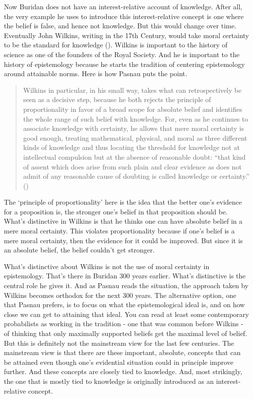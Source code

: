 \documentclass[
  12pt,
  letterpaper,
]{scrbook}
\begin{document}
Now Buridan does not have an interest-relative account of knowledge.
After all, the very example he uses to introduce this interest-relative
concept is one where the belief is false, and hence not knowledge. But
this would change over time. Eventually John Wilkins, writing in the
17th Century, would take moral certainty to be the standard for
knowledge (). Wilkins is
important to the history of science as one of the founders of the Royal
Society. And he is important to the history of epistemology because he
starts the tradition of centering epistemology around attainable norms.
Here is how Pasnau puts the point.

\begin{quote}
Wilkins in particular, in his small way, takes what can retrospectively
be seen as a decisive step, because he both rejects the principle of
proportionality in favor of a broad scope for absolute belief and
identifies the whole range of such belief with knowledge. For, even as
he continues to associate knowledge with certainty, he allows that mere
moral certainty is good enough, treating mathematical, physical, and
moral as three different kinds of knowledge and thus locating the
threshold for knowledge not at intellectual compulsion but at the
absence of reasonable doubt: ``that kind of assent which does arise from
such plain and clear evidence as does not admit of any reasonable cause
of doubting is called knowledge or certainty.''
()
\end{quote}

The `principle of proportionality' here is the idea that the better
one's evidence for a proposition is, the stronger one's belief in that
proposition should be. What's distinctive in Wilkins is that he thinks
one can have absolute belief in a mere moral certainty. This violates
proportionality because if one's belief is a mere moral certainty, then
the evidence for it could be improved. But since it is an absolute
belief, the belief couldn't get stronger.

What's distinctive about Wilkins is not the use of moral certainty in
epistemology. That's there in Buridan 300 years earlier. What's
distinctive is the central role he gives it. And as Pasnau reads the
situation, the approach taken by Wilkins becomes orthodox for the next
300 years. The alternative option, one that Pasnau prefers, is to focus
on what the epistemological ideal is, and on how close we can get to
attaining that ideal. You can read at least some contemporary
probabilists as working in the tradition - one that was common before
Wilkins - of thinking that only maximally supported beliefs get the
maximal level of belief. But this is definitely not the mainstream view
for the last few centuries. The mainstream view is that there are these
important, absolute, concepts that can be attained even though one's
evidential situation could in principle improve further. And these
concepts are closely tied to knowledge. And, most strikingly, the one
that is mostly tied to knowledge is originally introduced as an
interest-relative concept.
\end{document}
